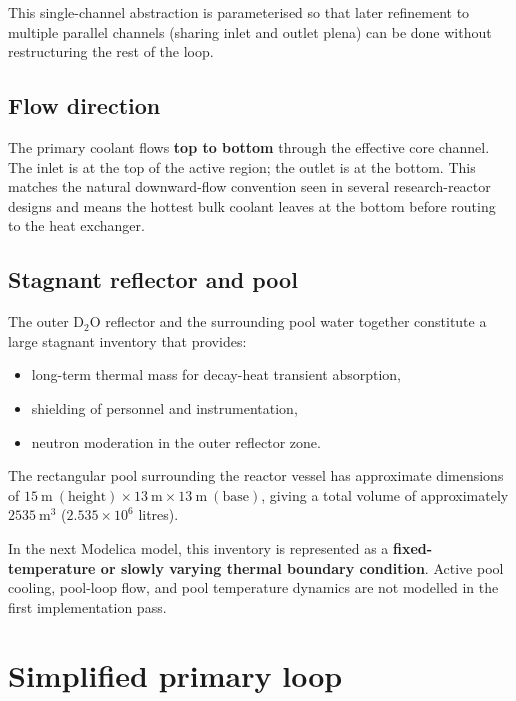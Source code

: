 \documentclass[11pt]{article}
\begin{document}
This single-channel abstraction is parameterised so that later refinement
to multiple parallel channels (sharing inlet and outlet plena) can be
done without restructuring the rest of the loop.

\subsection{Flow direction}

The primary coolant flows \textbf{top to bottom} through the effective
core channel.  The inlet is at the top of the active region; the outlet
is at the bottom.  This matches the natural downward-flow convention seen
in several research-reactor designs and means the hottest bulk coolant
leaves at the bottom before routing to the heat exchanger.

\subsection{Stagnant reflector and pool}

The outer D$_2$O reflector and the surrounding pool water together
constitute a large stagnant inventory that provides:
\begin{itemize}
  \item long-term thermal mass for decay-heat transient absorption,
  \item shielding of personnel and instrumentation,
  \item neutron moderation in the outer reflector zone.
\end{itemize}

The rectangular pool surrounding the reactor vessel has approximate
dimensions of $15\ \mathrm{m}\ (\mathrm{height}) \times
13\ \mathrm{m} \times 13\ \mathrm{m}\ (\mathrm{base})$, giving a total
volume of approximately $2535\ \mathrm{m^3}$ ($2.535 \times 10^6$
litres).

In the next Modelica model, this inventory is represented as a
\textbf{fixed-temperature or slowly varying thermal boundary condition}.
Active pool cooling, pool-loop flow, and pool temperature dynamics are
not modelled in the first implementation pass.

\section{Simplified primary loop}
\end{document}
